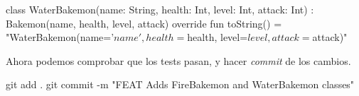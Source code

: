   \begin{kotlin}
    class WaterBakemon(name: String, health: Int, level: Int, attack: Int) :
        Bakemon(name, health, level, attack) {
      override fun toString() =
        "WaterBakemon(name='$name', health=$health, level=$level, attack=$attack)"
    }
  \end{kotlin}

  Ahora podemos comprobar que los tests pasan, y hacer \textit{commit} de los cambios.

  \begin{powershell}
    git add .
    git commit -m "FEAT Adds FireBakemon and WaterBakemon classes"
  \end{powershell}